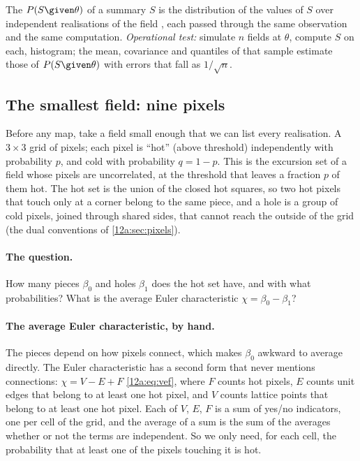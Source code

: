 \begin{workdef}
The  $P(S\given\theta)$ of a summary $S$  is the distribution of the values of $S$ over
independent realisations of the field , each
passed through the same observation and the same computation.
\emph{Operational test:} simulate $n$ fields at $\theta$, compute $S$ on each, histogram; the mean, covariance and
quantiles of that sample estimate those of $P(S\given\theta)$ with errors that fall as $1/\sqrt n$.
\end{workdef}

\subsection{The smallest field: nine pixels}
\label{12c:sec:tiny}

Before any map, take a field small enough that we can list every realisation. A $3\times3$ grid of pixels; each
pixel is ``hot'' (above threshold) independently with probability $p$, and cold with probability $q=1-p$. This is
the excursion set of a field whose pixels are uncorrelated, at the threshold that leaves a fraction $p$ of them hot.
The hot set is the union of the closed hot squares, so two hot pixels that touch only at a corner belong to the same
piece, and a hole is a group of cold pixels, joined through shared sides, that cannot reach the outside of the grid
(the dual conventions of \cref{12a:sec:pixels}).

\paragraph{The question.} How many pieces $\beta_0$ and holes $\beta_1$ does the hot set have, and with what
probabilities? What is the average Euler characteristic $\chi=\beta_0-\beta_1$?

\paragraph{The average Euler characteristic, by hand.}
The pieces depend on how pixels connect, which makes $\beta_0$ awkward to average directly. The Euler characteristic
has a second form that never mentions connections: $\chi=V-E+F$ \eqref{12a:eq:vef}, where $F$ counts hot pixels, $E$
counts unit edges that belong to at least one hot pixel, and $V$ counts lattice points that belong to at least one
hot pixel. Each of $V$, $E$, $F$ is a sum of yes/no indicators, one per cell of the grid, and the average of a sum is
the sum of the averages whether or not the terms are independent. So we only need, for each cell, the probability that
at least one of the pixels touching it is hot.

